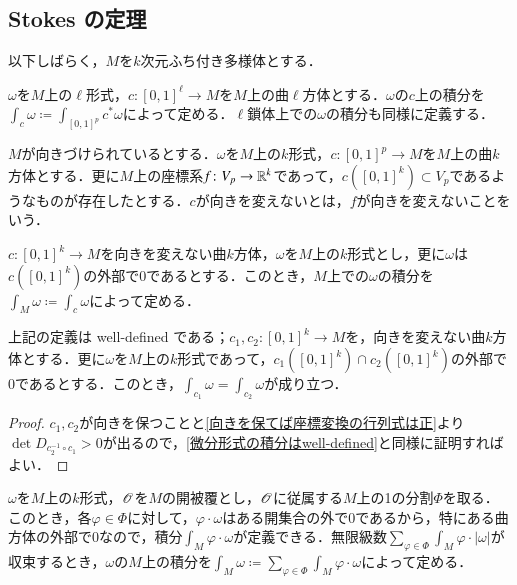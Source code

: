 \subsection{Stokes の定理}

以下しばらく，$M$を$k$次元ふち付き多様体とする．

\begin{defi}
$\omega$を$M$上の$\ell$形式，$c \colon [0,1]^\ell \to M$を$M$上の曲$\ell$方体とする．$\omega$の$c$上の積分を$\int_c \omega \coloneqq \int_{[0,1]^p}c^*\omega$によって定める．$\ell$鎖体上での$\omega$の積分も同様に定義する．
\end{defi}

\begin{defi}
$M$が向きづけられているとする．$\omega$を$M$上の$k$形式，$c \colon [0,1]^p \to M$を$M$上の曲$k$方体とする．更に$M$上の座標系$f \colon V_p \to \mathbb{R}^k$であって，$c([0,1]^k) \subset V_p$であるようなものが存在したとする．$c$が向きを変えないとは，$f$が向きを変えないことをいう．
\end{defi}

\begin{defi}
$c \colon [0,1]^k \to M$を向きを変えない曲$k$方体，$\omega$を$M$上の$k$形式とし，更に$\omega$は$c([0,1]^k)$の外部で0であるとする．このとき，$M$上での$\omega$の積分を$\int_M \omega \coloneqq \int_c \omega$によって定める．
\end{defi}

\begin{prop}
上記の定義は well-defined である；$c_1, c_2 \colon [0,1]^k \to M$を，向きを変えない曲$k$方体とする．更に$\omega$を$M$上の$k$形式であって，$c_1([0,1]^k) \cap c_2([0,1]^k)$の外部で0であるとする．このとき，$\int_{c_1} \omega = \int_{c_2} \omega$が成り立つ．
\end{prop}

\begin{proof}
$c_1, c_2$が向きを保つことと\cref{向きを保てば座標変換の行列式は正}より$\det D_{c_2^{-1} \circ c_1} > 0$が出るので，\cref{微分形式の積分はwell-defined}と同様に証明すればよい．
\end{proof}

\begin{defi}
$\omega$を$M$上の$k$形式，$\mathscr{O}$を$M$の開被覆とし，$\mathscr{O}$に従属する$M$上の1の分割$\Phi$を取る．このとき，各$\varphi \in \Phi$に対して，$\varphi \cdot \omega$はある開集合の外で0であるから，特にある曲方体の外部で0なので，積分$\int_M \varphi \cdot \omega$が定義できる．無限級数$\sum_{\varphi \in \Phi} \int_M \varphi \cdot | \omega |$が収束するとき，$\omega$の$M$上の積分を$\int_M \omega \coloneqq \sum_{\varphi \in \Phi} \int_M \varphi \cdot \omega$によって定める．
\end{defi}

